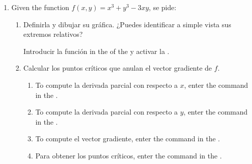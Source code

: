 \begin{enumerate}[leftmargin=*]
\item Given the function $f(x,y)=x^3+y^3-3xy$, se pide:
      \begin{enumerate}
      \item Definirla y dibujar su gráfica. ¿Puedes identificar a simple vista sus extremos relativos?
            \begin{indication}
            Introducir la función  in the  of the  y activar la .
            \end{indication}

      \item Calcular los puntos críticos que anulan el vector gradiente de $f$.
            \begin{indication}
            \begin{enumerate}
            \item To compute la derivada parcial con respecto a $x$, enter the command  in the .
            \item To compute la derivada parcial con respecto a $y$, enter the command  in the .
            \item To compute el vector gradiente, enter the command  in the .
            \item Para obtener los puntos críticos, enter the command  in the .
            \end{enumerate}
            \end{indication}


\end{enumerate}
\end{enumerate}

